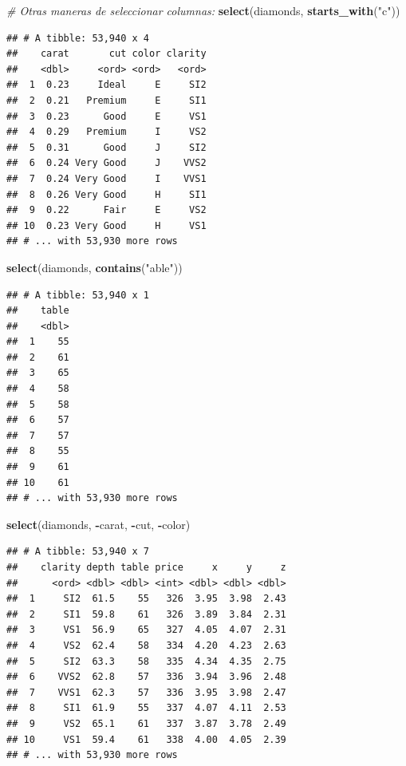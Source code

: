 \documentclass[]{book}
\newenvironment{Shaded}{\begin{snugshade}}{\end{snugshade}}
\newcommand{\KeywordTok}[1]{\textcolor[rgb]{0.13,0.29,0.53}{\textbf{#1}}}
\newcommand{\StringTok}[1]{\textcolor[rgb]{0.31,0.60,0.02}{#1}}
\newcommand{\CommentTok}[1]{\textcolor[rgb]{0.56,0.35,0.01}{\textit{#1}}}
\newcommand{\OperatorTok}[1]{\textcolor[rgb]{0.81,0.36,0.00}{\textbf{#1}}}
\newcommand{\NormalTok}[1]{#1}
\theoremstyle{definition}
\theoremstyle{definition}
\theoremstyle{definition}
\theoremstyle{remark}
\begin{document}
\begin{Shaded}
\begin{Highlighting}[]
\CommentTok{# Otras maneras de seleccionar columnas:}
\KeywordTok{select}\NormalTok{(diamonds, }\KeywordTok{starts_with}\NormalTok{(}\StringTok{"c"}\NormalTok{))}
\end{Highlighting}
\end{Shaded}

\begin{verbatim}
## # A tibble: 53,940 x 4
##    carat       cut color clarity
##    <dbl>     <ord> <ord>   <ord>
##  1  0.23     Ideal     E     SI2
##  2  0.21   Premium     E     SI1
##  3  0.23      Good     E     VS1
##  4  0.29   Premium     I     VS2
##  5  0.31      Good     J     SI2
##  6  0.24 Very Good     J    VVS2
##  7  0.24 Very Good     I    VVS1
##  8  0.26 Very Good     H     SI1
##  9  0.22      Fair     E     VS2
## 10  0.23 Very Good     H     VS1
## # ... with 53,930 more rows
\end{verbatim}

\begin{Shaded}
\begin{Highlighting}[]
\KeywordTok{select}\NormalTok{(diamonds, }\KeywordTok{contains}\NormalTok{(}\StringTok{"able"}\NormalTok{))}
\end{Highlighting}
\end{Shaded}

\begin{verbatim}
## # A tibble: 53,940 x 1
##    table
##    <dbl>
##  1    55
##  2    61
##  3    65
##  4    58
##  5    58
##  6    57
##  7    57
##  8    55
##  9    61
## 10    61
## # ... with 53,930 more rows
\end{verbatim}

\begin{Shaded}
\begin{Highlighting}[]
\KeywordTok{select}\NormalTok{(diamonds, }\OperatorTok{-}\NormalTok{carat, }\OperatorTok{-}\NormalTok{cut, }\OperatorTok{-}\NormalTok{color)}
\end{Highlighting}
\end{Shaded}

\begin{verbatim}
## # A tibble: 53,940 x 7
##    clarity depth table price     x     y     z
##      <ord> <dbl> <dbl> <int> <dbl> <dbl> <dbl>
##  1     SI2  61.5    55   326  3.95  3.98  2.43
##  2     SI1  59.8    61   326  3.89  3.84  2.31
##  3     VS1  56.9    65   327  4.05  4.07  2.31
##  4     VS2  62.4    58   334  4.20  4.23  2.63
##  5     SI2  63.3    58   335  4.34  4.35  2.75
##  6    VVS2  62.8    57   336  3.94  3.96  2.48
##  7    VVS1  62.3    57   336  3.95  3.98  2.47
##  8     SI1  61.9    55   337  4.07  4.11  2.53
##  9     VS2  65.1    61   337  3.87  3.78  2.49
## 10     VS1  59.4    61   338  4.00  4.05  2.39
## # ... with 53,930 more rows
\end{verbatim}
\end{document}

